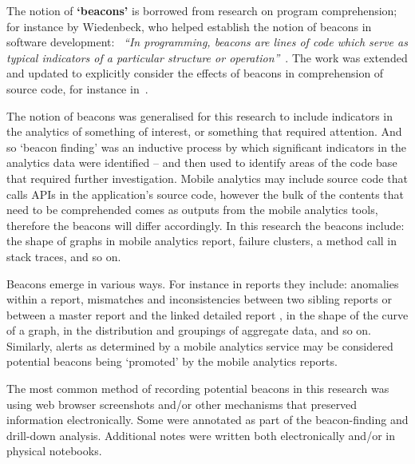 The notion of \textbf{`beacons'} is borrowed from research on program comprehension; for instance by Wiedenbeck, who helped establish the notion of beacons in software development: ~\emph{``In programming, beacons are lines of code which serve as typical indicators of a particular structure or operation''}~. The work was extended and updated to explicitly consider the effects of beacons in comprehension of source code, for instance in~.

The notion of beacons was generalised for this research to include indicators in the analytics of something of interest, or something that required attention.  And so `beacon finding' was an inductive process by which significant indicators in the analytics data were identified -- and then used to identify areas of the code base that required further investigation.  Mobile analytics may include source code that calls APIs in the application's source code, however the bulk of the contents that need to be comprehended comes as outputs from the mobile analytics tools, therefore the beacons will differ accordingly. In this research the beacons include: the shape of graphs in mobile analytics report, failure clusters, a method call in stack traces, and so on.


\begin{kaobox}[frametitle=Beacons in Mobile Analytics]

\end{kaobox}

Beacons emerge in various ways. For instance in reports they include: anomalies within a report, mismatches and inconsistencies between two sibling reports or between a master report and the linked detailed report%
, in the shape of the curve of a graph, in the distribution and groupings of aggregate data, and so on. Similarly, alerts as determined by a mobile analytics service may be considered potential beacons being `promoted' by the mobile analytics reports. 

The most common method of recording potential beacons in this research was using web browser screenshots and/or other mechanisms that preserved information electronically. Some were annotated as part of the beacon-finding and drill-down analysis. Additional notes were written both electronically and/or in physical notebooks. 

